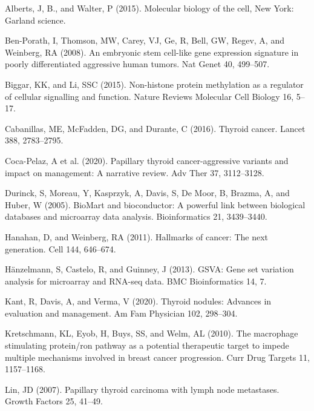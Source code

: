 \documentclass[
  parskip,
  oneside]{scrreprt}
\newlength{\cslhangindent}
\newlength{\cslentryspacingunit} %
\newenvironment{CSLReferences}[2] %
 {%
  \setlength{\parindent}{0pt}
  \ifodd #1
  \let\oldpar\par
  \def\par{\hangindent=\cslhangindent\oldpar}
  \fi
  \setlength{\parskip}{#2\cslentryspacingunit}
 }%
 {}
\begin{document}
\hypertarget{refs}{}
\begin{CSLReferences}{0}{0}
\leavevmode{}%
Alberts, J, B., and Walter, P (2015). Molecular biology of the cell, New
York: Garland science.

\leavevmode{}%
Ben-Porath, I, Thomson, MW, Carey, VJ, Ge, R, Bell, GW, Regev, A, and
Weinberg, RA (2008). An embryonic stem cell-like gene expression
signature in poorly differentiated aggressive human tumors. Nat Genet
40, 499--507.

\leavevmode{}%
Biggar, KK, and Li, SSC (2015). Non-histone protein methylation as a
regulator of cellular signalling and function. Nature Reviews Molecular
Cell Biology 16, 5--17.

\leavevmode{}%
Cabanillas, ME, McFadden, DG, and Durante, C (2016). Thyroid cancer.
Lancet 388, 2783--2795.

\leavevmode{}%
Coca-Pelaz, A et al. (2020). Papillary thyroid cancer-aggressive
variants and impact on management: A narrative review. Adv Ther 37,
3112--3128.

\leavevmode{}%
Durinck, S, Moreau, Y, Kasprzyk, A, Davis, S, De Moor, B, Brazma, A, and
Huber, W (2005). BioMart and bioconductor: A powerful link between
biological databases and microarray data analysis. Bioinformatics 21,
3439--3440.

\leavevmode{}%
Hanahan, D, and Weinberg, RA (2011). Hallmarks of cancer: The next
generation. Cell 144, 646--674.

\leavevmode{}%
Hänzelmann, S, Castelo, R, and Guinney, J (2013). GSVA: Gene set
variation analysis for microarray and RNA-seq data. BMC Bioinformatics
14, 7.

\leavevmode{}%
Kant, R, Davis, A, and Verma, V (2020). Thyroid nodules: Advances in
evaluation and management. Am Fam Physician 102, 298--304.

\leavevmode{}%
Kretschmann, KL, Eyob, H, Buys, SS, and Welm, AL (2010). The macrophage
stimulating protein/ron pathway as a potential therapeutic target to
impede multiple mechanisms involved in breast cancer progression. Curr
Drug Targets 11, 1157--1168.

\leavevmode{}%
Lin, JD (2007). Papillary thyroid carcinoma with lymph node metastases.
Growth Factors 25, 41--49.


\end{CSLReferences}
\end{document}
